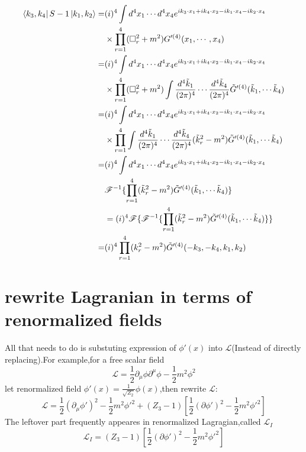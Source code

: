 \documentclass[a4paper]{article}
\begin{document}
\begin{align*}
	\bra{k_3,k_4}S-1\ket{k_1,k_2}=&(i)^4\int d^4x_1\cdots d^4x_4e^{ik_3\cdot x_1+ik_4\cdot x_2-ik_1\cdot x_4-ik_2\cdot x_4}\\&\times\prod_{r=1}^{4}(\Box_r^2+m^2)G'^{(4)}(x_1,\cdots,x_4)\\
	=&(i)^4\int d^4x_1\cdots d^4x_4e^{ik_3\cdot x_1+ik_4\cdot x_2-ik_1\cdot x_4-ik_2\cdot x_4}\\&\times\prod_{r=1}^{4}(\Box_r^2+m^2)\int \frac{d^4\tilde{k}_1}{(2\pi)^4}\cdots\frac{d^4\tilde{k}_4}{(2\pi)^4}\tilde{G}'^{(4)}(\tilde{k}_1,\cdots\tilde{k}_4)\\
	=&(i)^4\int d^4x_1\cdots d^4x_4e^{ik_3\cdot x_1+ik_4\cdot x_2-ik_1\cdot x_4-ik_2\cdot x_4}\\&\times\prod_{r=1}^{4}\int \frac{d^4\tilde{k}_1}{(2\pi)^4}\cdots\frac{d^4\tilde{k}_4}{(2\pi)^4}(\tilde{k}^2_r-m^2)\tilde{G}'^{(4)}(\tilde{k}_1,\cdots\tilde{k}_4)\\
	=&(i)^4\int d^4x_1\cdots d^4x_4e^{ik_3\cdot x_1+ik_4\cdot x_2-ik_1\cdot x_4-ik_2\cdot x_4}\\&\mathscr{F}^{-1}\{\prod_{r=1}^{4}(\tilde{k}^2_r-m^2)\tilde{G}'^{(4)}(\tilde{k}_1,\cdots\tilde{k}_4)\}\\&=(i)^4\mathscr{F}\{\mathscr{F}^{-1}\{\prod_{r=1}^{4}(\tilde{k}^2_r-m^2)\tilde{G}'^{(4)}(\tilde{k}_1,\cdots\tilde{k}_4)\}\}\\=&(i)^4\prod_{r=1}^{4}(k^2_r-m^2)\tilde{G}'^{(4)}(-k_3,-k_4,k_1,k_2)
\end{align*}
\section{rewrite Lagranian in terms of renormalized fields}
All that needs to do is substuting expression of $\phi'(x)$ into $\mathscr{L}$(Instead of directly replacing).For example,for a free scalar field$$\mathscr{L}=\frac{1}{2}\partial_{\mu}\phi\partial^{\mu}\phi-\frac{1}{2}m^2\phi^2$$let renormalized field $\phi'(x)=\frac{1}{\sqrt{Z_2}}\phi(x)$,then rewrite $\mathscr{L}$:$$\mathscr{L}=\frac{1}{2}(\partial_{\mu}\phi')^2-\frac{1}{2}m^2\phi'^2+(Z_3-1)[\frac{1}{2}(\partial\phi')^2-\frac{1}{2}m^2\phi'^2]$$
The leftover part frequently appeares in renormalized Lagragian,called $\mathscr{L}_I$
$$\mathscr{L}_I=(Z_3-1)[\frac{1}{2}(\partial\phi')^2-\frac{1}{2}m^2\phi'^2]$$
\end{document}
